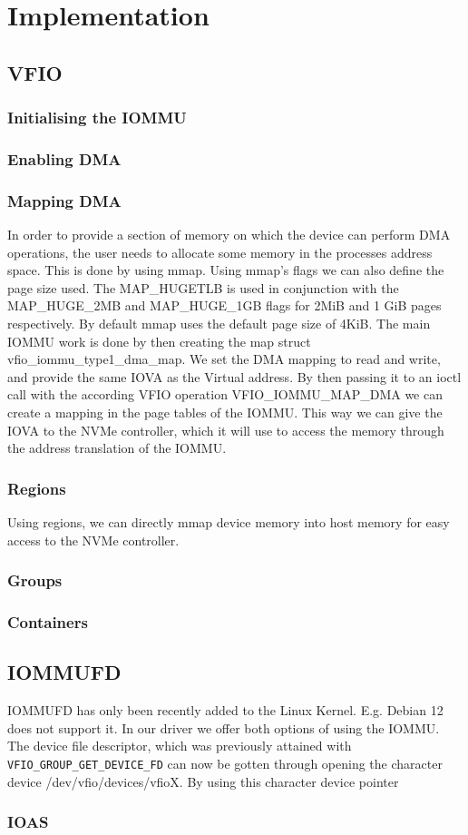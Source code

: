 \chapter{Implementation}

\section{VFIO}
\subsection{Initialising the IOMMU}
\subsection{Enabling DMA}
\subsection{Mapping DMA}
In order to provide a section of memory on which the device can perform DMA operations, the user needs to allocate some memory in the processes address space. This is done by using mmap. Using mmap's flags we can also define the page size used. The MAP\_HUGETLB is used in conjunction with the MAP\_HUGE\_2MB and MAP\_HUGE\_1GB flags for 2MiB and 1 GiB pages respectively. By default mmap uses the default page size of 4KiB.
The main IOMMU work is done by then creating the map struct vfio\_iommu\_type1\_dma\_map. We set the DMA mapping to read and write, and provide the same IOVA as the Virtual address. By then passing it to an ioctl call with the according VFIO operation VFIO\_IOMMU\_MAP\_DMA we can create a mapping in the page tables of the IOMMU.
This way we can give the IOVA to the NVMe controller, which it will use to access the memory through the address translation of the IOMMU.
\subsection{Regions}
Using regions, we can directly mmap device memory into host memory for easy access to the NVMe controller.
\subsection{Groups}
\subsection{Containers}
\section{IOMMUFD}
IOMMUFD has only been recently added to the Linux Kernel. E.g. Debian 12 does not support it. In our driver we offer both options of using the IOMMU.
The device file descriptor, which was previously attained with \texttt{VFIO\_GROUP\_GET\_DEVICE\_FD} can now be gotten through opening the character device /dev/vfio/devices/vfioX.
By using this character device pointer

\subsection{IOAS}
